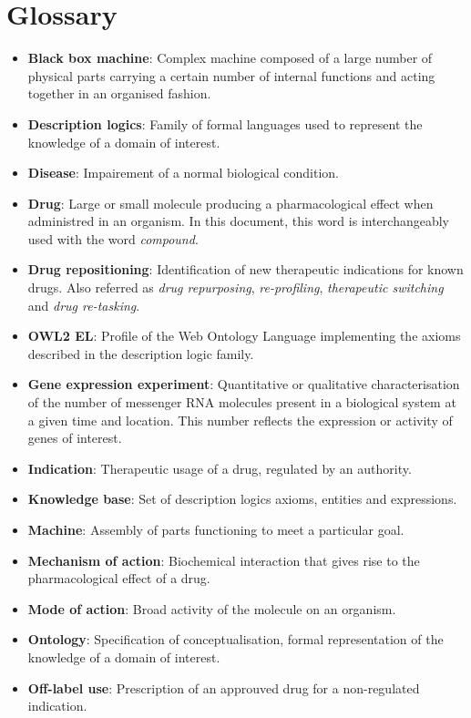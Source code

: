 \appendix
\chapter{Glossary}
\begin{itemize}
  \item \textbf{Black box machine}: Complex machine composed of a large number of physical parts carrying a certain number of internal functions and acting together in an organised fashion.
  \item \textbf{Description logics}: Family of formal languages used to represent the knowledge of a domain of interest.
  \item \textbf{Disease}: Impairement of a normal biological condition.
  \item \textbf{Drug}: Large or small molecule producing a pharmacological effect when administred in an organism. In this document, this word is interchangeably used with the word \emph{compound}.
  \item \textbf{Drug repositioning}: Identification of new therapeutic indications for known drugs. Also referred as \emph{drug repurposing}, \emph{re-profiling}, \emph{therapeutic switching} and \emph{drug re-tasking}.
  \item \textbf{OWL2 EL}: Profile of the Web Ontology Language implementing the axioms described in the description logic  family. 
  \item \textbf{Gene expression experiment}: Quantitative or qualitative characterisation of the number of messenger RNA molecules present in a biological system at a given time and location. This number reflects the expression or activity of genes of interest.
  \item \textbf{Indication}: Therapeutic usage of a drug, regulated by an authority.
  \item \textbf{Knowledge base}: Set of description logics axioms, entities and expressions.
  \item \textbf{Machine}: Assembly of parts functioning to meet a particular goal.
  \item \textbf{Mechanism of action}: Biochemical interaction that gives rise to the pharmacological effect of a drug.
  \item \textbf{Mode of action}: Broad activity of the molecule on an organism.
  \item \textbf{Ontology}: Specification of conceptualisation, formal representation of the knowledge of a domain of interest.
  \item \textbf{Off-label use}: Prescription of an approuved drug for a non-regulated indication.

\end{itemize}
